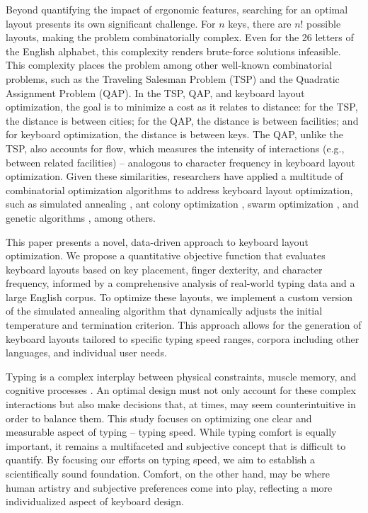 Beyond quantifying the impact of ergonomic features, searching for an optimal layout presents its own significant challenge. For $n$ keys, there are $n!$ possible layouts, making the problem combinatorially complex. Even for the 26 letters of the English alphabet, this complexity renders brute-force solutions infeasible. This complexity places the problem among other well-known combinatorial problems, such as the Traveling Salesman Problem (TSP) and the Quadratic Assignment Problem (QAP). In the TSP, QAP, and keyboard layout optimization, the goal is to minimize a cost as it relates to distance: for the TSP, the distance is between cities; for the QAP, the distance is between facilities; and for keyboard optimization, the distance is between keys. The QAP, unlike the TSP, also accounts for flow, which measures the intensity of interactions (e.g., between related facilities)  -- analogous to character frequency in keyboard layout optimization. Given these similarities, researchers have applied a multitude of combinatorial optimization algorithms to address keyboard layout optimization, such as simulated annealing \citep{light1993typewriter}, ant colony optimization \citep{eggers2003optimization}, swarm optimization \citep{yin2011cyber}, and genetic algorithms \citep{liebrock2005proceedings}, among others.

This paper presents a novel, data-driven approach to keyboard layout optimization. We propose a quantitative objective function that evaluates keyboard layouts based on key placement, finger dexterity, and character frequency, informed by a comprehensive analysis of real-world typing data and a large English corpus. To optimize these layouts, we implement a custom version of the simulated annealing algorithm that dynamically adjusts the initial temperature and termination criterion. This approach allows for the generation of keyboard layouts tailored to specific typing speed ranges, corpora including other languages, and individual user needs.

Typing is a complex interplay between physical constraints, muscle memory, and cognitive processes \citep{hiraga}. An optimal design must not only account for these complex interactions but also make decisions that, at times, may seem counterintuitive in order to balance them. This study focuses on optimizing one clear and measurable aspect of typing -- typing speed. While typing comfort is equally important, it remains a multifaceted and subjective concept that is difficult to quantify. By focusing our efforts on typing speed, we aim to establish a scientifically sound foundation. Comfort, on the other hand, may be where human artistry and subjective preferences come into play, reflecting a more individualized aspect of keyboard design. %

